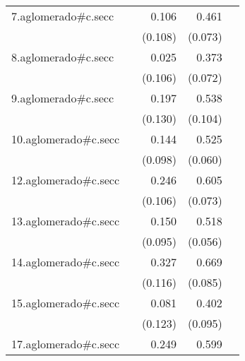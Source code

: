 {\begin{longtable}{l*{4}{D{.}{.}{-1}}}
\addlinespace
7.aglomerado#c.secc&                     &       0.106         &       0.461\sym{***}&                     \\
            &                     &     (0.108)         &     (0.073)         &                     \\
\addlinespace
8.aglomerado#c.secc&                     &       0.025         &       0.373\sym{***}&                     \\
            &                     &     (0.106)         &     (0.072)         &                     \\
\addlinespace
9.aglomerado#c.secc&                     &       0.197         &       0.538\sym{***}&                     \\
            &                     &     (0.130)         &     (0.104)         &                     \\
\addlinespace
10.aglomerado#c.secc&                     &       0.144         &       0.525\sym{***}&                     \\
            &                     &     (0.098)         &     (0.060)         &                     \\
\addlinespace
12.aglomerado#c.secc&                     &       0.246\sym{*}  &       0.605\sym{***}&                     \\
            &                     &     (0.106)         &     (0.073)         &                     \\
\addlinespace
13.aglomerado#c.secc&                     &       0.150         &       0.518\sym{***}&                     \\
            &                     &     (0.095)         &     (0.056)         &                     \\
\addlinespace
14.aglomerado#c.secc&                     &       0.327\sym{**} &       0.669\sym{***}&                     \\
            &                     &     (0.116)         &     (0.085)         &                     \\
\addlinespace
15.aglomerado#c.secc&                     &       0.081         &       0.402\sym{***}&                     \\
            &                     &     (0.123)         &     (0.095)         &                     \\
\addlinespace
17.aglomerado#c.secc&                     &       0.249\sym{*}  &       0.599\sym{***}&                     \\

\end{longtable}}
